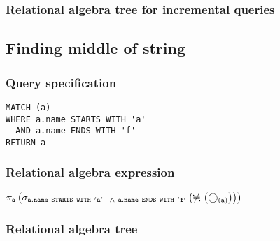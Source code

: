 \subsubsection*{Relational algebra tree for incremental queries}


\subsection{Finding middle of string}

\subsubsection*{Query specification}

\begin{lstlisting}
MATCH (a)
WHERE a.name STARTS WITH 'a'
  AND a.name ENDS WITH 'f'
RETURN a
\end{lstlisting}

\subsubsection*{Relational algebra expression}

$\projection{\var{a}} \left(\selection{\mathtt{a.name~STARTS~WITH~'a'
~~\land~a.name~ENDS~WITH~'f'}} \left(\alldifferent{} \left(\getvertices{a}{}\right)\right)\right)$

\subsubsection*{Relational algebra tree}


